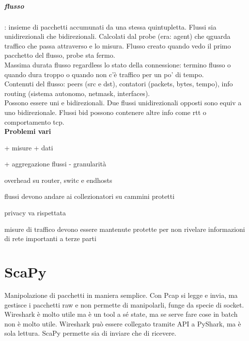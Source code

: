 \documentclass[10pt]{book}
\begin{document}
\paragraph{flusso}: insieme di pacchetti accumunati da una stessa quintupletta. Flussi sia unidirezionali che bidirezionali. Calcolati dal probe (era: agent) che qguarda traffico che passa attraverso e lo misura. Flusso creato quando vedo il primo pacchetto del flusso, probe sta fermo.\\
Massima durata flusso regardless lo stato della connessione: termino flusso o quando dura troppo o quando non c'è traffico per un po' di tempo.\\
Contenuti del flusso: peers (src e dst), contatori (packets, bytes, tempo), info routing (sistema autonomo, netmask, interfaces).\\
Possono essere uni e bidirezionali. Due flussi unidirezionali opposti sono equiv a uno bidirezionale. Flussi bid possono contenere altre info come rtt o comportamento tcp.\\
\textbf{Problemi vari}\\
\begin{list}{}{Overhead vs accuratezza}
	\item + misure + dati
	\item + aggregazione flussi - granularità
	\item overhead su router, switc e endhosts
\end{list}
\begin{list}{}{Security vs data sharing}
	\item flussi devono andare ai collezionatori su cammini protetti
	\item privacy va rispettata
	\item misure di traffico devono essere mantenute protette per non rivelare informazioni di rete importanti a terze parti
\end{list}

\chapter{ScaPy}
Manipolazione di pacchetti in maniera semplice. Con Pcap si legge e invia, ma gestisce i pacchetti raw e non permette di manipolarli, funge da specie di socket. Wireshark è molto utile ma è un tool a sé state, ma se serve fare cose in batch non è molto utile. Wireshark può essere collegato tramite API a PyShark, ma è sola lettura. ScaPy permette sia di inviare che di ricevere.
\end{document}
